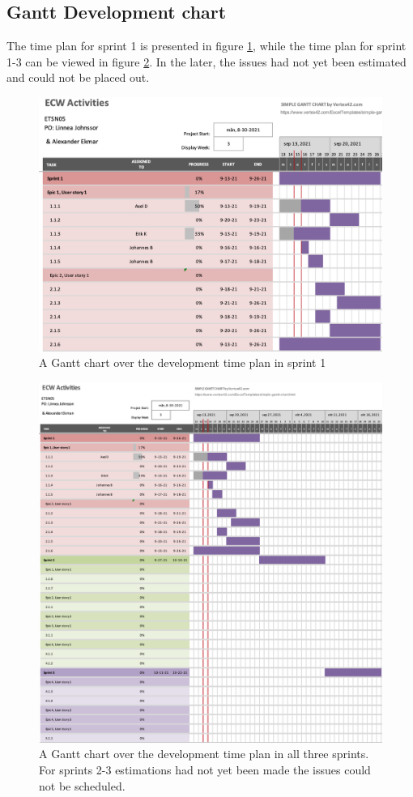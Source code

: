 \documentclass{article}
\begin{document}
\subsection{Gantt Development chart}
The time plan for sprint 1 is presented in figure \ref{fig:GantDev}, while the time plan for sprint 1-3 can be viewed in figure \ref{fig:GantDev2}. In the later, the issues had not yet been estimated and could not be placed out. 
\begin{figure}[H]
    \centering
    \includegraphics[scale=0.75]{sdpFigures/GantDev.png}
    \caption{A Gantt chart over the development time plan in sprint 1}
    \label{fig:GantDev}
\end{figure}
\begin{figure}[H]
    \centering
    \includegraphics[scale=0.9]{sdpFigures/GantDev2.png}
    \caption{A Gantt chart over the development time plan in all three sprints. For sprints 2-3 estimations had not yet been made the issues could not be scheduled. }
    \label{fig:GantDev2}
\end{figure}
\end{document}
